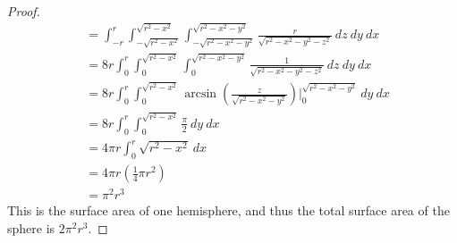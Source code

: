 \documentclass{article}
\theoremstyle{plain} %
\numberwithin{thm}{section} %
\theoremstyle{definition}
\begin{document}
\begin{proof}
\begin{align*}
        &= \int_{-r}^{r} \int_{-\sqrt{r^2 - x^2}}^{\sqrt{r^2 - x^2}} \int_{-\sqrt{r^2 - x^2 - y^2}}^{\sqrt{r^2 - x^2 - y^2}} \frac{r}{\sqrt{r^2 - x^2 - y^2 - z^2}}\ dz\ dy\ dx \\
        &=8r\int_{0}^{r} \int_{0}^{\sqrt{r^2 - x^2}} \int_{0}^{\sqrt{r^2 - x^2 - y^2}} \frac{1}{\sqrt{r^2 - x^2 - y^2 - z^2}}\ dz\ dy\ dx \\
        &= 8r\int_{0}^{r} \int_{0}^{\sqrt{r^2 - x^2}} \arcsin \left( \frac{z}{\sqrt{r^2 - x^2 - y^2}}\right) \Big|_0^{\sqrt{r^2 - x^2 - y^2}}\ dy\ dx \\
        &= 8r\int_{0}^{r} \int_{0}^{\sqrt{r^2 - x^2}} \frac{\pi}{2}\ dy\ dx \\
        &= 4\pi r \int_{0}^{r} \sqrt{r^2 - x^2}\ dx \\
        &= 4\pi r\left( \frac{1}{4}\pi r^2 \right) \\
        &= \pi^2 r^3
    \end{align*}
    This is the surface area of one hemisphere, and thus the total surface area of the sphere is \(2\pi ^2 r^3\).
        \end{proof}    
        \newpage   
\end{document}
